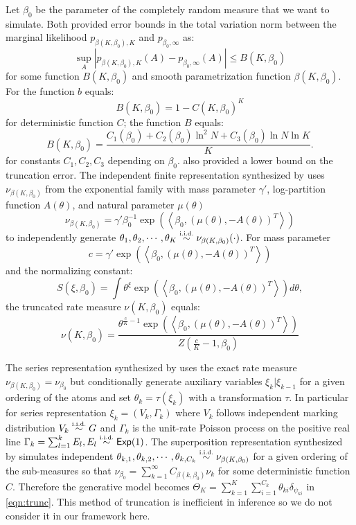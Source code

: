 \documentclass[letterpaper]{article}
\begin{document}
	Let $\beta_0$ be the parameter of the completely random measure that we want to simulate. Both \cite{campbell19,nguyen20} provided error bounds in the total variation norm between the marginal likelihood $p_{\beta(K,\beta_0),K}$ and $p_{\beta_0,\infty}$ as:
	\[
	\sup_A\left|p_{\beta(K,\beta_0),K}(A)-p_{\beta_0,\infty}(A)\right|\le B(K,\beta_0)
	\]
	for some function $B(K,\beta_0)$ and smooth parametrization function $\beta(K,\beta_0)$. For \cite{campbell19} the function $b$ equals:
	\[
	B(K,\beta_0)=1-C(K,\beta_0)^K
	\]
	for deterministic function $C$; \cite{nguyen20} the function $B$ equals:
	\[
	B(K,\beta_0)=\frac{C_1(\beta_0)+C_2(\beta_0)\ln^2N+C_3(\beta_0)\ln N\ln K}{K}.
	\]
	for constants $C_1,C_2,C_3$ depending on $\beta_0$. \cite{nguyen20} also provided a lower bound on the truncation error. The independent finite representation synthesized by \cite{nguyen20} uses $\nu_{\beta(K,\beta_0)}$ from the exponential family \cite{broderick18} with mass parameter $\gamma'$, log-partition function $A(\theta)$, and natural parameter $\mu(\theta)$ 
	\[
	\nu_{\beta(K,\beta_0)}=\gamma'\beta_0^{-1}\exp\left(\left<\beta_0,\left(\mu(\theta),-A(\theta)\right)^T\right>\right)
	\]
	to independently generate $\theta_1,\theta_2,\cdots,\theta_K\distiid\nu_{\beta(K,\beta_0)}(\cdot)$.  For mass parameter 
	\[
	c=\gamma'\exp\left(\left<\beta_0,\left(\mu(\theta),-A(\theta)\right)^T\right>\right)
	\] and the normalizing constant:
	\[
	S(\xi,\beta_0)=\int\theta^\xi\exp\left(\left<\beta_0,\left(\mu(\theta),-A(\theta)\right)^T\right>\right)d\theta,
	\] 
	the truncated rate measure $\nu(K,\beta_0)$ equals:
	\[
	\nu(K,\beta_0)=\frac{\theta^{\frac{c}{K}-1}\exp\left(\left<\beta_0,\left(\mu(\theta),-A(\theta)\right)^T\right>\right)}{Z\left(\frac{c}{K}-1,\beta_0\right)}
	\] 
	
	The series representation synthesized by \cite{campbell19} uses the exact rate measure $\nu_{\beta(K,\beta_0)}=\nu_{\beta_0}$ but conditionally generate auxiliary variables $\xi_k|\xi_{k-1}$ for a given ordering of the atoms and set $\theta_k=\tau(\xi_k)$ with a transformation $\tau$. In particular for series representation $\xi_k=(V_k,\Gamma_k)$ where $V_k$ follows independent marking distribution $V_k\distiid G$ and $\Gamma_k$ is the unit-rate Poisson process on the positive real line $\Gamma_k=\sum_{l=1}^kE_l,E_l\distiid\distExp(1)$. The superposition representation synthesized by \cite{campbell19} simulates independent $\theta_{k,1},\theta_{k,2},\cdots,\theta_{k,C_k}\distiid\nu_{\beta(K,\beta_0)}$ for a given ordering of the sub-measures so  that $\nu_{\beta_0}=\sum_{k=1}^\infty C_{\beta(k,\beta_0)}\nu_k$ for some deterministic function $C$. Therefore the generative model becomes $\Theta_K=\sum_{k=1}^K\sum_{i=1}^{C_k}\theta_{ki}\delta_{\psi_{ki}}$ in \ref{eqn:trunc}. This method of truncation is inefficient in inference \cite{zhu20,nguyen20} so we do not consider it in our framework here. 
	
\end{document}
